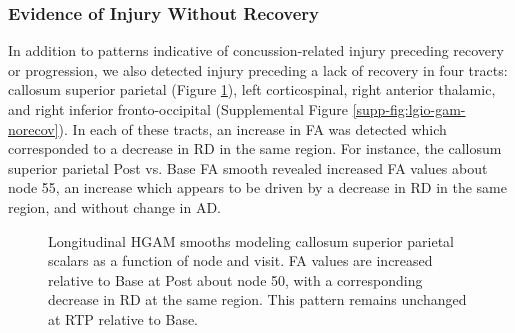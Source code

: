 \documentclass[12pt]{article}
\begin{document}
\subsubsection{Evidence of Injury Without Recovery}
\label{sssec:res-dwi-pat-norecov}
In addition to patterns indicative of concussion-related injury preceding recovery or progression, we also detected injury preceding a lack of recovery in four tracts: callosum superior parietal (Figure \ref{fig:lgio-gam-norecov}), left corticospinal, right anterior thalamic, and right inferior fronto-occipital (Supplemental Figure \ref{supp-fig:lgio-gam-norecov}). In each of these tracts, an increase in FA was detected which corresponded to a decrease in RD in the same region. For instance, the callosum superior parietal Post vs. Base FA smooth revealed increased FA values about node 55, an increase which appears to be driven by a decrease in RD in the same region, and without change in AD.

\begin{figure}[H]
	\centering
	\caption{Longitudinal HGAM smooths modeling callosum superior parietal scalars as a function of node and visit. FA values are increased relative to Base at Post about node 50, with a corresponding decrease in RD at the same region. This pattern remains unchanged at RTP relative to Base.}
	\label{fig:lgio-gam-norecov}
\end{figure}
\end{document}
